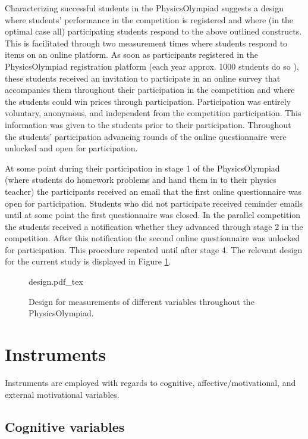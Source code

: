 \documentclass[]{interact}
\begin{document}
Characterizing successful students in the PhysicsOlympiad suggests a design where students' performance in the competition is registered and where (in the optimal case all) participating students respond to the above outlined constructs. This is facilitated through two measurement times where students respond to items on an online platform. As soon as participants registered in the PhysicsOlympiad registration platform (each year approx. 1000 students do so \citep{Petersen.2017}), these students received an invitation to participate in an online survey that accompanies them throughout their participation in the competition and where the students could win prices through participation. Participation was entirely voluntary, anonymous, and independent from the competition participation. This information was given to the students prior to their participation. Throughout the students' participation advancing rounds of the online questionnaire were unlocked and open for participation. 

At some point during their participation in stage 1 of the PhysicsOlympiad (where students do homework problems and hand them in to their physics teacher) the participants received an email that the first online questionnaire was open for participation. Students who did not participate received reminder emails until at some point the first questionnaire was closed. In the parallel competition the students received a notification whether they advanced through stage 2 in the competition. After this notification the second online questionnaire was unlocked for participation. This procedure repeated until after stage 4. The relevant design for the current study is displayed in Figure \ref{Design}.

\begin{figure}
\centering
{design.pdf_tex}
\caption{Design for measurements of different variables throughout the PhysicsOlympiad.}
\label{Design}
\end{figure}


\section{Instruments}

Instruments are employed with regards to cognitive, affective/motivational, and external motivational variables. 

\subsection{Cognitive variables}
\end{document}
